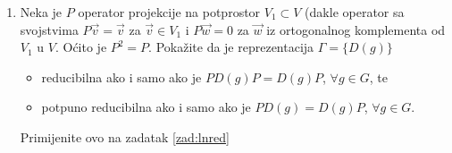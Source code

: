 \begin{enumerate}[label=\arabic{chapter}.\arabic*.]
\item Neka je $P$ operator projekcije na potprostor $V_1 \subset V$ (dakle operator sa svojstvima
$P \vec{v} = \vec{v}$ za $\vec{v}\in V_1$ i $P \vec{w} = 0$ za $\vec{w}$ iz ortogonalnog komplementa
od $V_1$ u $V$. Oćito je $P^2 = P$. Pokažite  da je reprezentacija $\Gamma = \{D(g)\}$ 
\begin{itemize}
\item reducibilna ako i samo ako je $PD(g)P = D(g)P$, $\forall g\in G$, te
\item potpuno reducibilna ako i samo ako je $PD(g) = D(g)P$, $\forall g\in G$.
\end{itemize}
Primijenite ovo na zadatak \ref{zad:lnred}

\end{enumerate}

